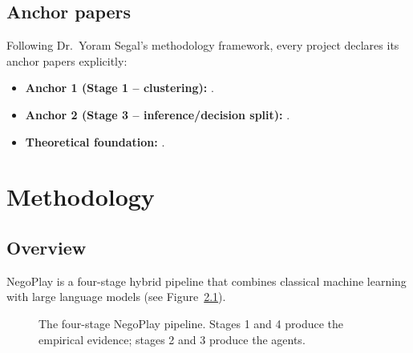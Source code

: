 \documentclass[11pt, a4paper, oneside, openany]{report}
\begin{document}
\section{Anchor papers}

Following Dr.\ Yoram Segal's methodology framework, every project declares its anchor papers explicitly:

\begin{itemize}[leftmargin=*]
    \item \textbf{Anchor 1 (Stage 1 -- clustering):} \citet{talwadker2022cognitionnet}.
    \item \textbf{Anchor 2 (Stage 3 -- inference/decision split):} \citet{rong2019competitive}.
    \item \textbf{Theoretical foundation:} \citet{lockett2007evolving}.
\end{itemize}

\chapter{Methodology}
\label{ch:method}

\section{Overview}

NegoPlay is a four-stage hybrid pipeline that combines classical machine learning with large language models (see Figure~\ref{fig:pipeline}).

\begin{figure}[H]
\centering
{}
\caption{The four-stage NegoPlay pipeline. Stages 1 and 4 produce the empirical evidence; stages 2 and 3 produce the agents.}
\label{fig:pipeline}
\end{figure}
\end{document}
